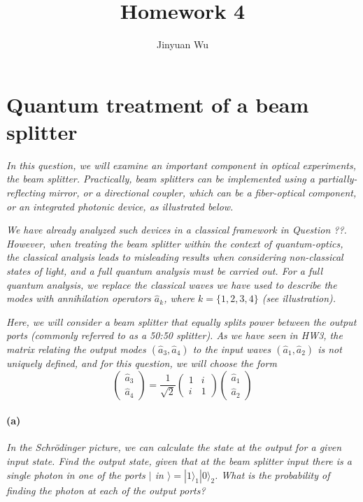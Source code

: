 \documentclass[hyperref, a4paper]{article}
\title{Homework 4}
\author{Jinyuan Wu}
\begin{document}
\maketitle


\section{Quantum treatment of a beam splitter}

\textit{In this question, we will examine an important component in optical experiments, the beam splitter. Practically, beam splitters can be implemented using a partially-reflecting mirror, or a directional coupler, which can be a fiber-optical component, or an integrated photonic device, as illustrated below.}

\textit{We have already analyzed such devices in a classical framework in Question ??. However, when treating the beam splitter within the context of quantum-optics, the classical analysis leads to misleading results when considering non-classical states of light, and a full quantum analysis must be carried out. For a full quantum analysis, we replace the classical waves we have used to describe the modes with annihilation operators $\hat{a}_k$, where $k=\{1,2,3,4\}$ (see illustration).}

\textit{Here, we will consider a beam splitter that equally splits power between the output ports (commonly referred to as a 50:50 splitter). As we have seen in HW3, the matrix relating the output modes $\left(\hat{a}_3, \hat{a}_4\right)$ to the input waves $\left(\hat{a}_1, \hat{a}_2\right)$ is not uniquely defined, and for this question, we will choose the form}
$$
\left(\begin{array}{l}
\hat{a}_3 \\
\hat{a}_4
\end{array}\right)=\frac{1}{\sqrt{2}}\left(\begin{array}{ll}
1 & i \\
i & 1
\end{array}\right)\left(\begin{array}{l}
\hat{a}_1 \\
\hat{a}_2
\end{array}\right)
$$

\paragraph*{(a)} \textit{In the Schrödinger picture, we can calculate the state at the output for a given input state. Find the output state, given that at the beam splitter input there is a single photon in one of the ports $\mid$ in $\rangle=|1\rangle_1|0\rangle_2$. What is the probability of finding the photon at each of the output ports?} 
\end{document}
